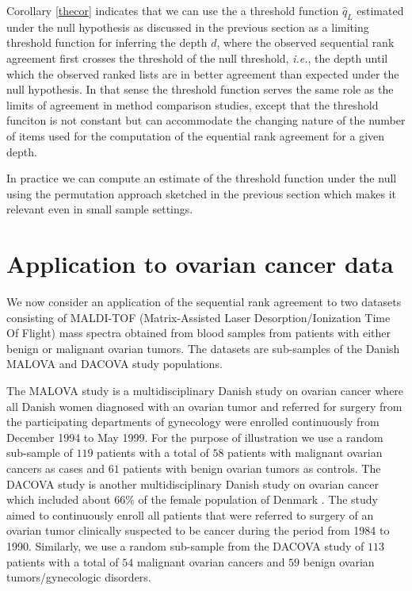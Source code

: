\documentclass[12pt,a4paper]{article}
\makeatletter
\newcommand{\ie}{\emph{i.e.}\@\xspace}
\newcommand{\mcomment}[1]{\textcolor{red}{\textbf{#1}}}
\theoremstyle{plain}
\makeatother
\begin{document}
Corollary \ref{thecor} indicates that we can use the a threshold
function $\widehat{q}_L$ estimated under the null hypothesis as
discussed in the previous section as a limiting threshold function for
inferring the depth $d$, where the observed sequential rank agreement
first crosses the threshold of the null threshold, \ie, the depth
until which the observed ranked lists are in better agreement than
expected under the null hypothesis. In that sense the threshold
function serves the same role as the limits of agreement in method
comparison studies, except that the threshold funciton is not constant
but can accommodate the changing nature of the number of items used
for the computation of the equential rank agreement for a given depth.

In practice we can compute an estimate of the threshold function under
the null using the permutation approach sketched in the previous
section which makes it relevant even in small sample settings.


\section{Application to ovarian cancer data}
We now consider an application of the sequential rank agreement to two
datasets consisting of MALDI-TOF (Matrix-Assisted Laser
Desorption/Ionization Time Of Flight) mass spectra obtained from blood
samples from patients with either benign or malignant ovarian
tumors. The datasets are sub-samples of the Danish MALOVA and DACOVA
study populations.

The MALOVA study is a multidisciplinary Danish study on ovarian cancer
\citep{Hogdall:2004:Cancer:15160342} where all Danish women diagnosed
with an ovarian tumor and referred for surgery from the participating
departments of gynecology were enrolled continuously from December
1994 to May 1999. For the purpose of illustration we use a random
sub-sample of $119$ patients with a total of $58$ patients with
malignant ovarian cancers as cases and $61$ patients with benign
ovarian tumors as controls. The DACOVA study is another
multidisciplinary Danish study on ovarian cancer which included about
$66\%$ of the female population of Denmark
\citep{bertelsen1991protocol}. The study aimed to continuously enroll
all patients that were referred to surgery of an ovarian tumor
clinically suspected to be cancer during the period from 1984 to
1990. Similarly, we use a random sub-sample from the DACOVA study of
$113$ patients with a total of $54$ malignant ovarian cancers and $59$
benign ovarian tumors/gynecologic disorders.
\end{document}
